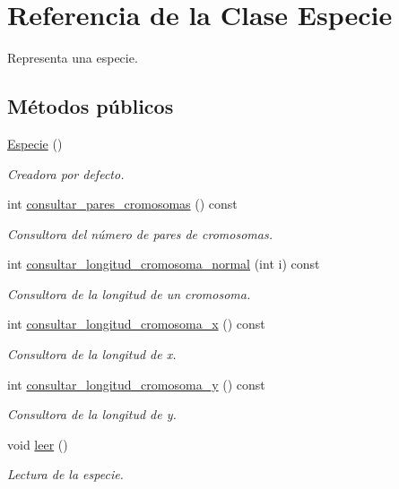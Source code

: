 \hypertarget{class_especie}{}\section{Referencia de la Clase Especie}
\label{class_especie}


Representa una especie.  


\subsection*{Métodos públicos}
\begin{DoxyCompactItemize}
\item 
\hyperlink{class_especie_a272c2488719cc9874b2f174906675b3d}{Especie} ()
\begin{DoxyCompactList}\small\item\em Creadora por defecto. \end{DoxyCompactList}\item 
int \hyperlink{class_especie_a94666f2f2ff0dcfe29e2065eabdce213}{consultar\+\_\+pares\+\_\+cromosomas} () const 
\begin{DoxyCompactList}\small\item\em Consultora del número de pares de cromosomas. \end{DoxyCompactList}\item 
int \hyperlink{class_especie_a2b45f904d78a40980e4e5416b2114c28}{consultar\+\_\+longitud\+\_\+cromosoma\+\_\+normal} (int i) const 
\begin{DoxyCompactList}\small\item\em Consultora de la longitud de un cromosoma. \end{DoxyCompactList}\item 
int \hyperlink{class_especie_a38523cc3b55bb9d5764dddabc22c7da2}{consultar\+\_\+longitud\+\_\+cromosoma\+\_\+x} () const 
\begin{DoxyCompactList}\small\item\em Consultora de la longitud de x. \end{DoxyCompactList}\item 
int \hyperlink{class_especie_a52aba18b3261338808cd78c92ba4388e}{consultar\+\_\+longitud\+\_\+cromosoma\+\_\+y} () const 
\begin{DoxyCompactList}\small\item\em Consultora de la longitud de y. \end{DoxyCompactList}\item 
void \hyperlink{class_especie_a2335c9ddc4757e964d78e6267304cf52}{leer} ()
\begin{DoxyCompactList}\small\item\em Lectura de la especie. \end{DoxyCompactList}\end{DoxyCompactItemize}


